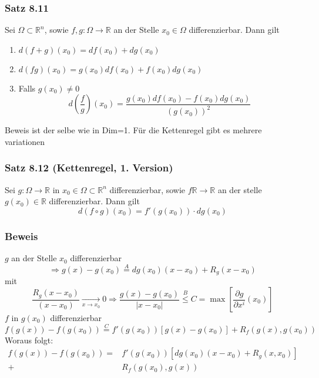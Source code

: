 \subsubsection*{Satz 8.11}
Sei $\Omega\subset\mathbb{R}^n$, sowie $f,g:\Omega\rightarrow\mathbb{R}$ an der Stelle $x_0\in\Omega$ differenzierbar. Dann gilt \begin{enumerate}
\item $d\left( {f + g} \right)\left( {{x_0}} \right) = df\left( {{x_0}} \right) + dg\left( {{x_0}} \right)$
\item $d\left( {fg} \right)\left( {{x_0}} \right) = g\left( {{x_0}} \right)df\left( {{x_0}} \right) + f\left( {{x_0}} \right)dg\left( {{x_0}} \right)$
\item Falls $g\left( x_0\right)\not=0$ \[d\left( {\frac{f}{g}} \right)\left( {{x_0}} \right) = \frac{{g\left( {{x_0}} \right)df\left( {{x_0}} \right) - f\left( {{x_0}} \right)dg\left( {{x_0}} \right)}}{{{{\left( {g\left( {{x_0}} \right)} \right)}^2}}}\]
\end{enumerate}
Beweis ist der selbe wie in Dim=1. Für die Kettenregel gibt es mehrere variationen 

\subsubsection*{Satz 8.12 (Kettenregel, 1. Version)}
Sei $g:\Omega\rightarrow\mathbb{R}$ in $x_0\in\Omega\subset\mathbb{R}^n$ differenzierbar, sowie $f\mathbb{R}\rightarrow\mathbb{R}$ an der stelle $g\left( x_0\right)\in\mathbb{R}$ differenzierbar. Dann gilt \[d\left( {f \circ g} \right)\left( {{x_0}} \right) = f'\left( {g\left( {{x_0}} \right)} \right) \cdot dg\left( {{x_0}} \right)\]


\subsubsection*{Beweis}
$g$ an der Stelle $x_0$ differenzierbar 
\[ \Rightarrow g\left( x \right) - g\left( {{x_0}} \right)\mathop  = \limits^A dg\left( {{x_0}} \right)\left( {x - {x_0}} \right) + {R_g}\left( {x - {x_0}} \right)\]
mit \[\frac{{{R_g}\left( {x - {x_0}} \right)}}{{\left( {x - {x_0}} \right)}}\mathop  \to \limits_{x \to {x_0}} 0 \Rightarrow \frac{{g\left( x \right) - g\left( {{x_0}} \right)}}{{\left| {x - {x_0}} \right|}}\mathop  \le \limits^B C = \max \left[ {\frac{{\partial g}}{{\partial {x^i}}}\left( {{x_0}} \right)} \right]\] $f$ in $g\left( x_0\right)$ differenzierbar 
\[f\left( {g\left( x \right)} \right) - f\left( {g\left( {{x_0}} \right)} \right)\mathop  = \limits^C f'\left( {g\left( {{x_0}} \right)} \right)\left[ {g(x) - g\left( {{x_0}} \right)} \right] + {R_f}\left( {g\left( x \right),g\left( {{x_0}} \right)} \right)\]
Woraus folgt:
\begin{align*}
f\left( {g\left( x \right)} \right) - f\left( {g\left( {{x_0}} \right)} \right) = & f'\left( {g\left( {{x_0}} \right)} \right)\left[ {dg\left( {{x_0}} \right)\left( {x - {x_0}} \right) + {R_g}\left( {x,{x_0}} \right)} \right]\\ + & {R_f}\left( {g\left( {{x_0}} \right),g\left( x \right)} \right)
\end{align*}

